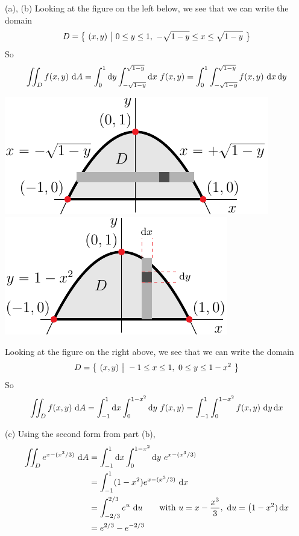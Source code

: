 \begin{solution}
(a), (b) 
Looking at the figure on the left below, we see that we can write
the domain
\begin{equation*}
D = \big\{ \ (x,y)\ \big|\ 0\le y\le 1,\ -\sqrt{1-y}\le x\le\sqrt{1-y}\ \big\}
\end{equation*}
So
\begin{equation*}
\dblInt_D f(x,y)\ \dee{A}
=\int_0^1\dee{y} \int_{-\sqrt{1-y}}^{\sqrt{1-y}}\dee{x}\ f(x,y)
=\int_0^1 \int_{-\sqrt{1-y}}^{\sqrt{1-y}} f(x,y)\ \dee{x}\,\dee{y}
\end{equation*}

\begin{center}
\includegraphics{fig/OE15D_6B.pdf}\qquad
\includegraphics{fig/OE15D_6A.pdf}
\end{center}

Looking at the figure on the right above, we see that we can write
the domain
\begin{equation*}
D = \Set{(x,y)}{-1\le x\le 1,\ 0\le y\le 1-x^2}
\end{equation*}
So
\begin{equation*}
\iint_D f(x,y)\ \mathrm{d}A
=\int_{-1}^1\mathrm{d}x \int_0^{1-x^2}\mathrm{d}y\ f(x,y)
=\int_{-1}^1 \int_0^{1-x^2} f(x,y)\ \mathrm{d}y\,\mathrm{d}x
\end{equation*}

(c) Using the second form from part (b),
\begin{align*}
\dblInt_D e^{x-(x^3/3)}\ \dee{A}
&=\int_{-1}^1\dee{x} \int_0^{1-x^2}\dee{y}\ e^{x-(x^3/3)} \\
&=\int_{-1}^1 (1-x^2) e^{x-(x^3/3)}\ \dee{x} \\
&=\int_{-2/3}^{2/3} e^u\ \dee{u} \qquad\text{with }
   u=x -\frac{x^3}{3},\ 
   \dee{u} = \big(1-x^2)\,\dee{x} \\
&= e^{2/3}-e^{-2/3}
\end{align*}
\end{solution}

